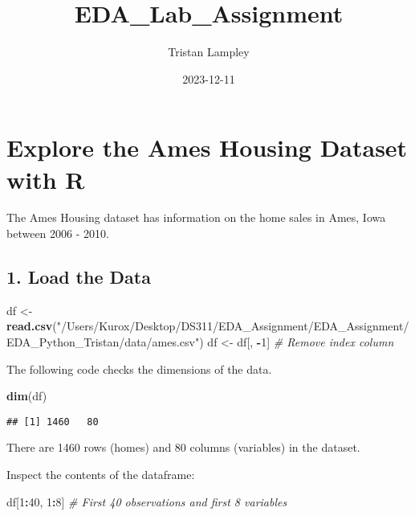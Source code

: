 \documentclass[
]{article}
\title{EDA\_Lab\_Assignment}
\author{Tristan Lampley}
\date{2023-12-11}
\newenvironment{Shaded}{\begin{snugshade}}{\end{snugshade}}
\newcommand{\CommentTok}[1]{\textcolor[rgb]{0.56,0.35,0.01}{\textit{#1}}}
\newcommand{\DecValTok}[1]{\textcolor[rgb]{0.00,0.00,0.81}{#1}}
\newcommand{\FunctionTok}[1]{\textcolor[rgb]{0.13,0.29,0.53}{\textbf{#1}}}
\newcommand{\NormalTok}[1]{#1}
\newcommand{\OtherTok}[1]{\textcolor[rgb]{0.56,0.35,0.01}{#1}}
\newcommand{\SpecialCharTok}[1]{\textcolor[rgb]{0.81,0.36,0.00}{\textbf{#1}}}
\newcommand{\StringTok}[1]{\textcolor[rgb]{0.31,0.60,0.02}{#1}}
\begin{document}
\maketitle

\hypertarget{explore-the-ames-housing-dataset-with-r}{%
\section{Explore the Ames Housing Dataset with
R}\label{explore-the-ames-housing-dataset-with-r}}

The Ames Housing dataset has information on the home sales in Ames, Iowa
between 2006 - 2010.

\hypertarget{load-the-data}{%
\subsection{1. Load the Data}\label{load-the-data}}

\begin{Shaded}
\begin{Highlighting}[]
\NormalTok{df }\OtherTok{\textless{}{-}} \FunctionTok{read.csv}\NormalTok{(}\StringTok{"/Users/Kurox/Desktop/DS311/EDA\_Assignment/EDA\_Assignment/EDA\_Python\_Tristan/data/ames.csv"}\NormalTok{)}
\NormalTok{df }\OtherTok{\textless{}{-}}\NormalTok{ df[, }\SpecialCharTok{{-}}\DecValTok{1}\NormalTok{] }\CommentTok{\# Remove index column}
\end{Highlighting}
\end{Shaded}

The following code checks the dimensions of the data.

\begin{Shaded}
\begin{Highlighting}[]
\FunctionTok{dim}\NormalTok{(df)}
\end{Highlighting}
\end{Shaded}

\begin{verbatim}
## [1] 1460   80
\end{verbatim}

There are 1460 rows (homes) and 80 columns (variables) in the dataset.

Inspect the contents of the dataframe:

\begin{Shaded}
\begin{Highlighting}[]
\NormalTok{df[}\DecValTok{1}\SpecialCharTok{:}\DecValTok{40}\NormalTok{, }\DecValTok{1}\SpecialCharTok{:}\DecValTok{8}\NormalTok{] }\CommentTok{\# First 40 observations and first 8 variables}
\end{Highlighting}
\end{Shaded}
\end{document}
